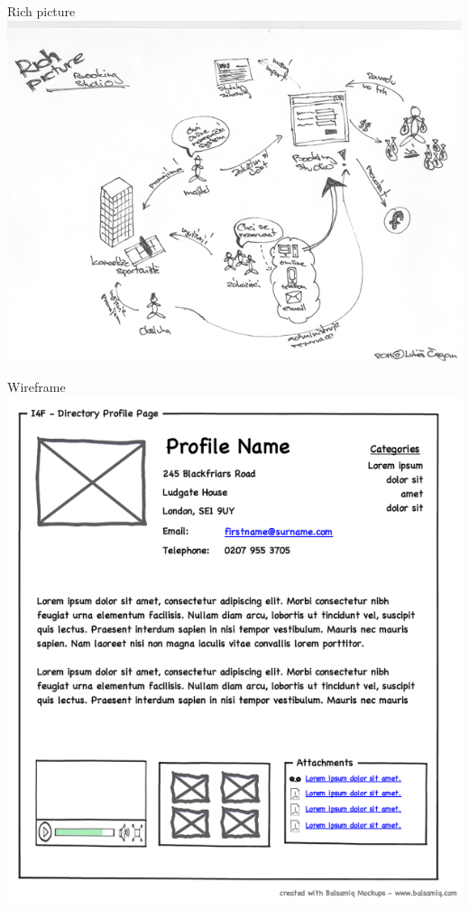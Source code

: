 \documentclass{beamer}
\begin{document}
\begin{frame}{Rich picture}
  \includegraphics[width=\columnwidth]{rich-picture}
\end{frame}

\begin{frame}{Wireframe}
	  \includegraphics[width=\textwidth,height=\textheight,keepaspectratio]{wireframe}
\end{frame}
\end{document}
